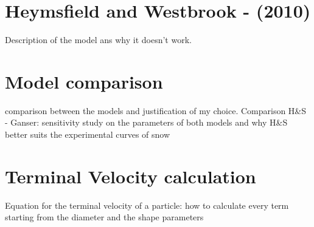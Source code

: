 	\section{Heymsfield and Westbrook - (2010)}
		Description of the model ans why it doesn't work.

	\section{Model comparison}
		comparison between the models and justification of my choice.
		Comparison H\&S - Ganser: sensitivity study on the parameters of both models and why H\&S better suits the experimental curves of snow
	\section{Terminal Velocity calculation}
		Equation for the terminal velocity of a particle: how to calculate every term starting from the diameter and the shape parameters
	
